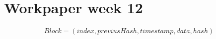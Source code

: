 

\author{Group D608F16}
\title{}



\maketitle

\section{Workpaper week 12}

\begin{align*}
Block = (index, previusHash, timestamp, data, hash)
\end{align*}
\citep{Meredith2005}



\grid
\grids
